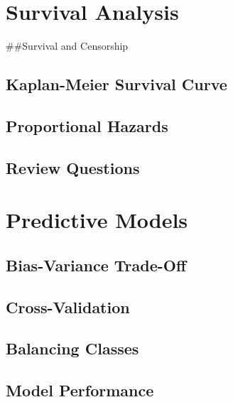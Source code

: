 \documentclass[]{book}
\begin{document}
\hypertarget{surv-anal}{%
\chapter{Survival Analysis}\label{surv-anal}}

\#\#Survival and Censorship

\hypertarget{kaplan-meier-survival-curve}{%
\section{Kaplan-Meier Survival Curve}\label{kaplan-meier-survival-curve}}

\hypertarget{proportional-hazards}{%
\section{Proportional Hazards}\label{proportional-hazards}}

\hypertarget{review-questions-9}{%
\section{Review Questions}\label{review-questions-9}}

\hypertarget{pred-mod}{%
\chapter{Predictive Models}\label{pred-mod}}

\hypertarget{bias-variance-trade-off}{%
\section{Bias-Variance Trade-Off}\label{bias-variance-trade-off}}

\hypertarget{cross-validation}{%
\section{Cross-Validation}\label{cross-validation}}

\hypertarget{balancing-classes}{%
\section{Balancing Classes}\label{balancing-classes}}

\hypertarget{model-performance}{%
\section{Model Performance}\label{model-performance}}
\end{document}

